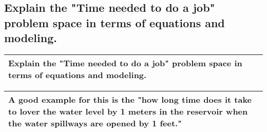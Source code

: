 \subsection{
        Explain the "Time needed to do a job" problem space in terms of
    equations and modeling.}
\begin{small}
    \begin{tabularx}{1\textwidth}{
            p{}
        }
        \toprule
        Explain the "Time needed to do a job" problem space in terms of
        equations and modeling.
        \\
        \bottomrule
    \end{tabularx}
\end{small}
\begin{small}
    \begin{tabularx}{1\textwidth}{
            p{}
        }
        \toprule
        A good example for this is the "how long time does it take to lover the
        water level by 1 meters in the reservoir when the water spillways are
        opened by 1 feet."
        \\
        \bottomrule
    \end{tabularx}
\end{small}

